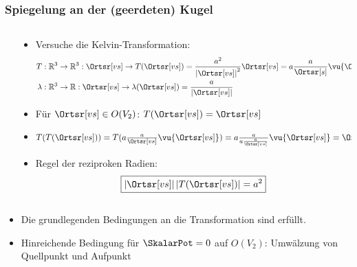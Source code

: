 \begin{frame}
  \frametitle{Spiegelung an der (geerdeten) Kugel}
  \begin{columns}
    \begin{column}{.35\textwidth}
      \end{column}
      \begin{column}{.5\textwidth}
        \begin{itemize}[<+->]
        \item Versuche die \alert{Kelvin-Transformation}:
          \begin{align*}
            T & :  \mathbb{R}^3 \to \mathbb{R}^3 : \Ortsr[vs] \to T(\Ortsr[vs]) = \frac{a^2}{\left| \Ortsr[vs]\right|^2} \Ortsr[vs] = a \frac{a}{\Ortsr[s]} \vu{\Ortsr[s]}\\
            \lambda & :  \mathbb{R}^3 \to \mathbb{R} : \Ortsr[vs] \to \lambda(\Ortsr[vs]) = \frac{a}{\left| \Ortsr[vs]\right|}  
          \end{align*}
        \item Für $\Ortsr[vs] \in O(V_2)$: $T(\Ortsr[vs]) = \Ortsr[vs]$
        \item $T(T(\Ortsr[vs])) = T(a \frac{a}{\Ortsr[vs]} \vu{\Ortsr[vs]}) =  a \frac{a}{a \frac{a}{\Ortsr[vs]}} \vu{\Ortsr[vs]} = \Ortsr[vs]$
        \item Regel der \alert{reziproken Radien}:
          \begin{equation*}
            \boxed{\left| \Ortsr[vs] \right| \left| T(\Ortsr[vs]) \right| = a^2}
            \end{equation*}
          \end{itemize}
        \end{column}
      \end{columns}
      \begin{itemize}[<+->]
        \item Die grundlegenden Bedingungen an die Transformation sind erfüllt. 
        \item Hinreichende Bedingung für $\SkalarPot = 0$ auf $O(V_2)$: Umwälzung von Quellpunkt und Aufpunkt
        \end{itemize}
\end{frame}

